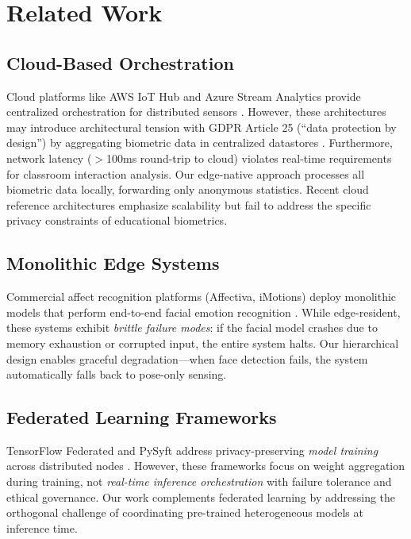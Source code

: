 \documentclass[conference]{IEEEtran}
\begin{document}
\section{Related Work}

\subsection{Cloud-Based Orchestration}
Cloud platforms like AWS IoT Hub and Azure Stream Analytics provide centralized orchestration for distributed sensors \cite{b6}. However, these architectures may introduce architectural tension with GDPR Article 25 (``data protection by design'') by aggregating biometric data in centralized datastores \cite{b16}. Furthermore, network latency ($>$100ms round-trip to cloud) violates real-time requirements for classroom interaction analysis. Our edge-native approach processes all biometric data locally, forwarding only anonymous statistics. Recent cloud reference architectures emphasize scalability but fail to address the specific privacy constraints of educational biometrics.

\subsection{Monolithic Edge Systems}
Commercial affect recognition platforms (Affectiva, iMotions) deploy monolithic models that perform end-to-end facial emotion recognition \cite{b7}. While edge-resident, these systems exhibit \textit{brittle failure modes}: if the facial model crashes due to memory exhaustion or corrupted input, the entire system halts. Our hierarchical design enables graceful degradation---when face detection fails, the system automatically falls back to pose-only sensing.

\subsection{Federated Learning Frameworks}
TensorFlow Federated and PySyft address privacy-preserving \textit{model training} across distributed nodes \cite{b8}. However, these frameworks focus on weight aggregation during training, not \textit{real-time inference orchestration} with failure tolerance and ethical governance.  Our work complements federated learning by addressing the orthogonal challenge of coordinating pre-trained heterogeneous models at inference time.
\end{document}
